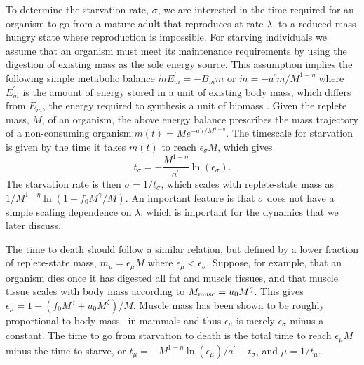 \documentclass[twocolumn,preprintnumbers,amsmath,amssymb,superscriptaddress]{revtex4}
\begin{document}
{To determine the starvation rate, $\sigma$, we are interested in the time
required for an organism to go from a mature adult that reproduces at rate
$\lambda$, to a
reduced-mass hungry state where reproduction is impossible.  For starving individuals we assume that an organism must meet its maintenance requirements by using the digestion of existing mass as the sole energy source.
This assumption implies the following simple metabolic balance
$\dot{m}E_{m}^{\prime}=-B_{m}m$ or $\dot{m}=-a^{\prime}m/M^{1-\eta}$
where $E_{m}^{\prime}$ is the amount of energy stored in a unit of existing
body mass, which differs from $E_{m}$, the energy required to
synthesis a unit of biomass \citep{hou}. Given the replete mass, $M$, of an organism, the
above energy balance prescribes the mass trajectory of a non-consuming
organism:$m\left(t\right)=Me^{-a^{\prime}t/M^{1-\eta}}$.
The timescale for starvation is
given by the time it takes $m(t)$ to reach $\epsilon_{\sigma} M$, which gives
\begin{equation}
\label{eq:sigma}
t_{\sigma}=-\frac{M^{1-\eta}}{a^{\prime}}\ln\left(\epsilon_{\sigma}\right).
\end{equation}
The starvation rate is then $\sigma=1/t_{\sigma}$, which scales with
replete-state mass as $1/M^{1-\eta}\ln\left(1-f_{0}M^{\gamma}/M\right)$.  An important
feature is that $\sigma$ does not have a simple scaling dependence on
$\lambda$, which is important for the dynamics that we
later discuss.

The time to death should follow a similar relation, but defined by a lower
fraction of replete-state mass, $m_{\mu}=\epsilon_{\mu} M$ where $\epsilon_\mu < \epsilon_\sigma$.
Suppose, for example, that an organism dies once it has digested all fat and
muscle tissues, and that muscle tissue scales with body mass according to
$M_{\rm musc}=u_{0}M^{\zeta}$.  This gives
$\epsilon_{\mu}=1-\left(f_{0}M^{\gamma}+u_{0}M^{\zeta}\right)/M$. Muscle
mass has been shown to be roughly proportional to body mass~\citep{Folland:2008ij} in
mammals and thus $\epsilon_{\mu}$ is merely $\epsilon_{\sigma}$ minus a constant. The time to go from starvation to death is the total time to reach $\epsilon_{\mu}M$ minus the time to starve, or $t_{\mu}=-M^{1-\eta}\ln\left(\epsilon_{\mu}\right)/a^{\prime}-t_{\sigma}$,
and $\mu=1/t_{\mu}$.
}
\end{document}
